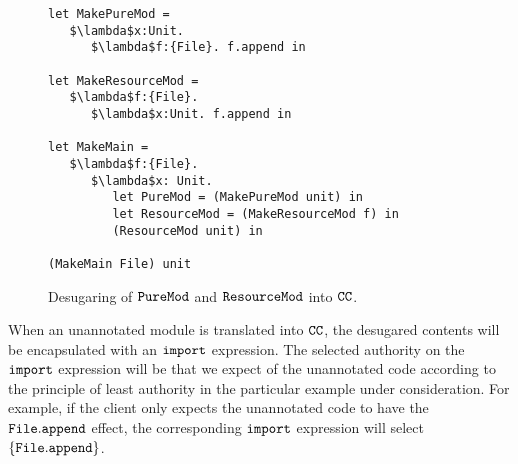 \begin{figure}[h]

\begin{lstlisting}
let MakePureMod =
   $\lambda$x:Unit.
      $\lambda$f:{File}. f.append in

let MakeResourceMod =
   $\lambda$f:{File}.
      $\lambda$x:Unit. f.append in

let MakeMain =
   $\lambda$f:{File}.
      $\lambda$x: Unit.
         let PureMod = (MakePureMod unit) in
         let ResourceMod = (MakeResourceMod f) in
         (ResourceMod unit) in

(MakeMain File) unit
\end{lstlisting}

\caption{Desugaring of $\mathtt{PureMod}$ and $\mathtt{ResourceMod}$ into $\mathtt{CC}$.}
\label{fig:wyv_tutorial_desugaring}
\end{figure}

When an unannotated module is translated into $\mathtt{CC}$, the desugared contents will be encapsulated with an $\mathtt{import}$ expression. The selected authority on the $\mathtt{import}$ expression will be that we expect of the unannotated code according to the principle of least authority in the particular example under consideration. For example, if the client only expects the unannotated code to have the $\mathtt{File.append}$ effect, the corresponding $\mathtt{import}$ expression will select $\mathtt{\{File.append\}}$.